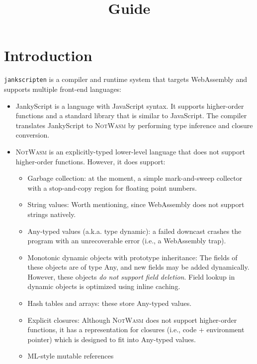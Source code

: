 \documentclass{book}
\title{\system Guide}
\newcommand{\system}{\texttt{jankscripten}\xspace}
\newcommand{\notwasm}{\textsc{NotWasm}\xspace}
\newcommand{\jankyscript}{JankyScript\xspace}
\begin{document}
\maketitle

\tableofcontents

\chapter{Introduction}

\system is a compiler and runtime system that targets WebAssembly and supports
multiple front-end languages:

\begin{itemize}

\item \jankyscript is a language with JavaScript syntax. It supports
higher-order functions and a standard library that is similar to JavaScript.
The compiler translates JankyScript to \notwasm by performing type inference
and closure conversion.

\item \notwasm is an explicitly-typed lower-level language that does not
support higher-order functions. However, it does support:
  
\begin{itemize}

\item Garbage collection: at the moment, a simple mark-and-sweep collector with
a stop-and-copy region for floating point numbers.

\item String values: Worth mentioning, since WebAssembly does not support
strings natively.

\item Any-typed values (a.k.a. type dynamic): a failed downcast crashes the
program with an unrecoverable error (i.e., a WebAssembly trap).

\item Monotonic dynamic objects with prototype inheritance: The fields of these
objects are of type Any, and new fields may be added dynamically. However,
these objects \emph{do not support field deletion}. Field lookup in dynamic
objects is optimized using inline caching.

\item Hash tables and arrays: these store Any-typed values.

\item Explicit closures: Although \notwasm does not support higher-order
functions, it has a representation for closures (i.e., code + environment
pointer) which is designed to fit into Any-typed values.

\item ML-style mutable references

\end{itemize}

\end{itemize}
\end{document}
